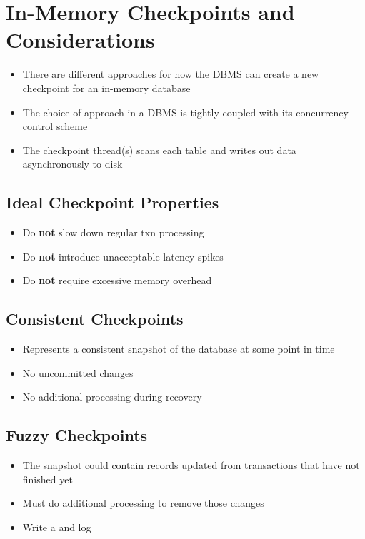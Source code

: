 \documentclass[11pt]{article}
\begin{document}
\maketitle
\thispagestyle{plain}

\section{In-Memory Checkpoints and Considerations}
\begin{itemize}
    \item There are different approaches for how the DBMS can create a new checkpoint for an in-memory database
    \item The choice of approach in a DBMS is tightly coupled with its concurrency control scheme
    \item The checkpoint thread(s) scans each table and writes out data asynchronously to disk
\end{itemize}

    \subsection*{Ideal Checkpoint Properties~\cite{p1539-ren}}
    \begin{itemize}
        \item Do \textbf{not} slow down regular txn processing
        \item Do \textbf{not} introduce unacceptable latency spikes
        \item Do \textbf{not} require excessive memory overhead
    \end{itemize}

    \subsection*{Consistent Checkpoints}
    \begin{itemize}
        \item Represents a consistent snapshot of the database at some point in time
        \item No uncommitted changes
        \item No additional processing during recovery
    \end{itemize}

    \subsection*{Fuzzy Checkpoints}
    \begin{itemize}
        \item The snapshot could contain records updated from transactions that have not finished yet
        \item Must do additional processing to remove those changes
        \item Write a  and  log
    \end{itemize}
\end{document}
